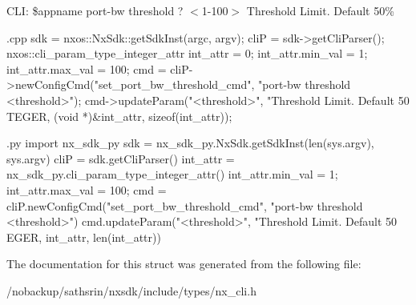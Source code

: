 CLI: \$appname port-\/bw threshold ? $<$1-\/100$>$ Threshold Limit. Default 50\%


\begin{DoxyCode}
 {.cpp}
       sdk = nxos::NxSdk::getSdkInst(argc, argv);
       cliP = sdk->getCliParser();
       nxos::cli_param_type_integer_attr int_attr = {0};
       int_attr.min_val = 1;
       int_attr.max_val = 100;
       cmd = cliP->newConfigCmd("set_port_bw_threshold_cmd",
                                "port-bw threshold <threshold>");
       cmd->updateParam("<threshold>", "Threshold Limit. Default 50%
      TEGER,
                        (void *)&int_attr, sizeof(int_attr));
\end{DoxyCode}



\begin{DoxyCode}
 {.py}
       import nx_sdk_py
       sdk = nx_sdk_py.NxSdk.getSdkInst(len(sys.argv), sys.argv)
       cliP = sdk.getCliParser()
       int_attr = nx_sdk_py.cli_param_type_integer_attr()
       int_attr.min_val = 1;
       int_attr.max_val = 100;
       cmd = cliP.newConfigCmd("set_port_bw_threshold_cmd", 
                               "port-bw threshold <threshold>")
       cmd.updateParam("<threshold>", "Threshold Limit. Default 50%
      EGER,
                       int_attr, len(int_attr))
\end{DoxyCode}
 

The documentation for this struct was generated from the following file:\begin{DoxyCompactItemize}
\item 
/nobackup/sathsrin/nxsdk/include/types/nx\_\-cli.h\end{DoxyCompactItemize}
